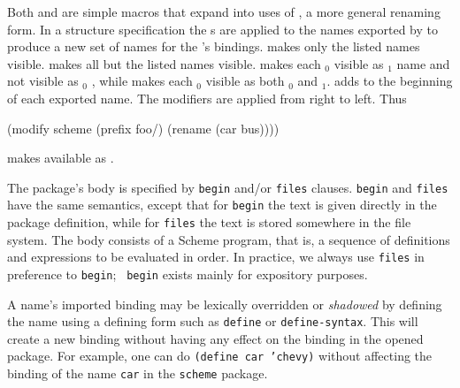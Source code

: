Both  and  are simple macros that
 expand into uses of , a more general renaming form.
In a  structure specification the s are applied to
 the names exported
 by  to produce a new set of names for the 's
 bindings.
 makes only the listed names visible.
 makes all but the listed names visible.
 makes each $_0$ visible as $_1$ 
 name and not visible as $_0$ , while
  makes each $_0$ visible as both $_0$ 
 and $_1$.
 adds  to the beginning of each exported name.
The modifiers are applied from right to left.  Thus
\begin{example}
(modify scheme (prefix foo/) (rename (car bus))))
\end{example}
 makes  available as .

%

The package's body is specified by {\tt begin} and/or {\tt files}
clauses.  {\tt begin} and {\tt files} have the same semantics, except
that for {\tt begin} the text is given directly in the package
definition, while for {\tt files} the text is stored somewhere in the
file system.  The body consists of a Scheme program, that is, a
sequence of definitions and expressions to be evaluated in order.  In
practice, we always use {\tt files} in preference to {\tt begin}; {\tt
begin} exists mainly for expository purposes.

A name's imported binding may be lexically overridden or {\em shadowed}
by defining the name using a defining form such as {\tt define}
or {\tt define-\ok{}syntax}.  This will create a new binding without having
any effect on the binding in the opened package.  For example, one can
do {\tt(define car 'chevy)} without affecting the binding of the name
{\tt car} in the {\tt scheme} package.

